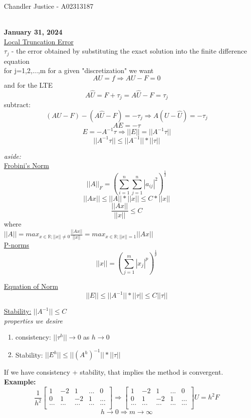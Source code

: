 \documentclass[10pt]{article}
\newcommand{\R}{\mathbb{R}}
\begin{document}
\begin{flushright}
Chandler Justice - A02313187
\end{flushright}
\noindent \underline{\hspace{3in}}\\

\textbf{January 31, 2024}\\

\underline{Local Truncation Error}\\


$\tau_j$ - the error obtained by substituting the exact solution into the finite difference equation\\


for j=1,2,...,m \quad for a given "discretization" we want\\
\[AU = f \Rightarrow AU -F = 0\]
and for the LTE
\[A\hat{U} = F + \tau_j = A\hat{U} -F = \tau_j\]
subtract:
\[(AU-F) - (A\hat{U} -F) = -\tau_j \Rightarrow A(U-\hat{U}) = -\tau_j\]
\[AE = -\tau\]
\[E = -A^{-1} \tau \Rightarrow ||E|| = ||A^{-1}\tau||\]
\[||A^{-1}\tau|| \leq ||A^{-1}||* ||\tau||\]

\textit{aside:}\\
\underline{Frobini's Norm}
\[||A||_F = (\sum_{i=1}^n\sum_{j=1}^n |a_{ij}|^2)^{\frac{1}{2}}\]
\[||Ax|| \leq ||A|| * ||x|| \leq C * ||x||\]
\[\frac{||Ax||}{||x||} \leq C\]
where\\
$||A|| = max_{x \in \R; ||x|| \neq 0} \frac{||Ax||}{||x||} = max_{x \in \R; ||x|| = 1}||Ax||$\\

\underline{P-norms}
\[||x|| = (\sum_{j=1}^m |x_j|^p)^{\frac{1}{p}}\]

\underline{Equation of Norm}
\[||E|| \leq ||A^{-1}|| * ||\tau|| \leq C ||\tau||\]

\underline{Stability:} $||A^{-1}|| \leq C$\\

\textit{properties we desire}
\begin{enumerate}
    \item consistency: $||\tau^h|| \to 0$ as $h \to 0$
    \item Stability: $||E^h|| \leq ||(A^h)^{-1}|| * ||\tau||$
\end{enumerate}

If we have consistency + stability, that implies the method is convergent.\\

\textbf{Example:}
\[\frac{1}{h^2} \begin{bmatrix}
1 & -2 & 1 & ... & 0\\
0 & 1 & -2 & 1 & ...\\
... & ... & ... & ... & ...\\
\end{bmatrix}
\Rightarrow
\begin{bmatrix}
1 & -2 & 1 & ... & 0\\
0 & 1 & -2 & 1 & ...\\
... & ... & ... & ... & ...\\
\end{bmatrix}
U = h^2 F
\]
\[h \to 0 \Rightarrow m \to \infty\]
\end{document}
